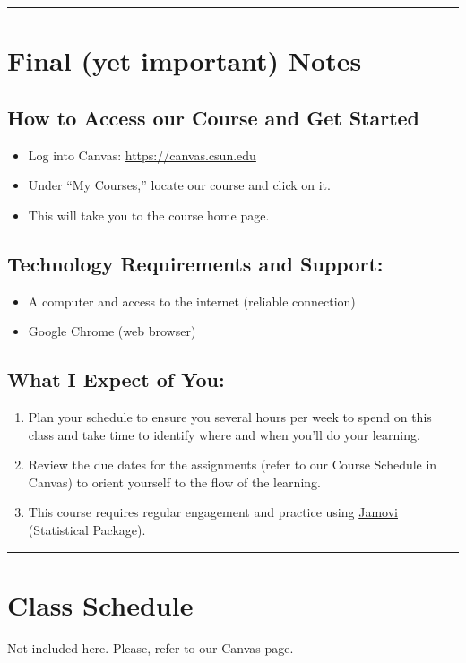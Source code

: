 \documentclass[11pt,]{article}
\providecommand{\tightlist}{%
  \setlength{\itemsep}{0pt}\setlength{\parskip}{0pt}}
\begin{document}
\begin{center}\rule{0.5\linewidth}{0.5pt}\end{center}

\hypertarget{final-yet-important-notes}{%
\section{Final (yet important) Notes}\label{final-yet-important-notes}}

\hypertarget{how-to-access-our-course-and-get-started}{%
\subsection{How to Access our Course and Get
Started}\label{how-to-access-our-course-and-get-started}}

\begin{itemize}
\tightlist
\item
  Log into Canvas: \url{https://canvas.csun.edu}
\item
  Under ``My Courses,'' locate our course and click on it.
\item
  This will take you to the course home page.
\end{itemize}

\hypertarget{technology-requirements-and-support}{%
\subsection{Technology Requirements and
Support:}\label{technology-requirements-and-support}}

\begin{itemize}
\tightlist
\item
  A computer and access to the internet (reliable connection)
\item
  Google Chrome (web browser)
\end{itemize}

\hypertarget{what-i-expect-of-you}{%
\subsection{What I Expect of You:}\label{what-i-expect-of-you}}

\begin{enumerate}
\def\labelenumi{\arabic{enumi}.}
\tightlist
\item
  Plan your schedule to ensure you several hours per week to spend on
  this class and take time to identify where and when you'll do your
  learning.
\item
  Review the due dates for the assignments (refer to our Course Schedule
  in Canvas) to orient yourself to the flow of the learning.
\item
  This course requires regular engagement and practice using
  \protect\hyperlink{supplies}{Jamovi} (Statistical Package).
\end{enumerate}

\begin{center}\rule{0.5\linewidth}{0.5pt}\end{center}

\hypertarget{class-schedule}{%
\section{Class Schedule}\label{class-schedule}}

Not included here. Please, refer to our Canvas page.
\end{document}
